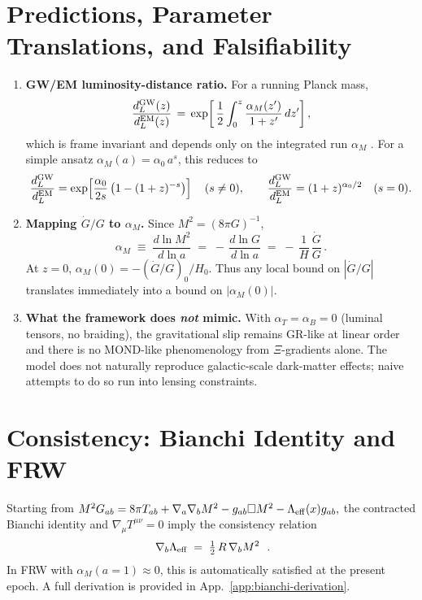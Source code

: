 \documentclass[aps,prd,onecolumn,superscriptaddress,nofootinbib]{revtex4-2}
\def\boxed#1{#1}%
\begin{document}
\section{Predictions, Parameter Translations, and Falsifiability}
\label{sec:predictions}
\begin{enumerate}[leftmargin=1.3em]
\item \textbf{GW/EM luminosity-distance ratio.} For a running Planck mass,
\begin{equation}
\frac{d_L^{\rm GW}(z)}{d_L^{\rm EM}(z)} \,=\, \exp\!\left[\, \frac{1}{2}\int_{0}^{z} \frac{\alpha_M(z')}{1+z'}\,dz' \right],
\end{equation}
which is frame invariant and depends only on the integrated run \(\alpha_M\) \cite{LombriserTaylor2016}. For a simple ansatz \(\alpha_M(a)=\alpha_0\, a^s\), this reduces to
\[
\frac{d_L^{\rm GW}}{d_L^{\rm EM}} = \exp\!\left[\frac{\alpha_0}{2s}\,\big(1-(1+z)^{-s}\big)\right]\quad (s\neq 0),\qquad
\frac{d_L^{\rm GW}}{d_L^{\rm EM}} = (1+z)^{\alpha_0/2}\quad (s=0).
\]
\item \textbf{Mapping \(\dot G/G\) to \(\alpha_M\).} Since \(M^2\!=\!(8\pi G)^{-1}\),
\begin{equation}
\alpha_M \;\equiv\; \frac{d\ln M^2}{d\ln a} \;=\; -\,\frac{d\ln G}{d\ln a}
\;=\; -\,\frac{1}{H}\,\frac{\dot G}{G}\,.
\label{eq:alphaM-dotG}
\end{equation}
At \(z\!=\!0\), \(\alpha_M(0)=-(\dot G/G)_0/H_0\). Thus any local bound on \(|\dot G/G|\) translates immediately into a bound on \(|\alpha_M(0)|\).
\item \textbf{What the framework does \emph{not} mimic.} With \(\alpha_T=\alpha_B=0\) (luminal tensors, no braiding), the gravitational slip remains GR-like at linear order and there is no MOND-like phenomenology from \(\Xi\)-gradients alone. The model does not naturally reproduce galactic-scale dark-matter effects; naive attempts to do so run into lensing constraints.
\end{enumerate}

\section{Consistency: Bianchi Identity and FRW}
\label{sec:bianchi}
Starting from
\(
M^2 G_{ab}=8\pi T_{ab}+\nabla_a\nabla_b M^2-g_{ab}\Box M^2-\Lambda_{\rm eff}(x) g_{ab},
\)
the contracted Bianchi identity and \(\nabla_\mu T^{\mu\nu}=0\) imply the consistency relation
\begin{equation}
\boxed{\ \nabla_b \Lambda_{\rm eff} \;=\; \tfrac{1}{2}\,R\,\nabla_b M^2\ }\ .
\label{eq:bianchi-consistency}
\end{equation}
In FRW with \(\alpha_M(a{=}1)\!\approx\!0\), this is automatically satisfied at the present epoch. A full derivation is provided in App.~\ref{app:bianchi-derivation}.
\end{document}
